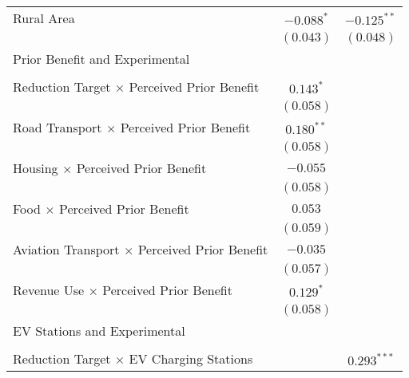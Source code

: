 \begin{center}
\begin{tiny}
\begin{longtable}{l@{} c@{} c@{}}
Rural Area                                                & $-0.088^{*}$     & $-0.125^{**}$    \\
                                                          & $(0.043)$        & $(0.048)$        \\
Prior Benefit and Experimental                            &                  &                  \\
                                                          &                  &                  \\
\quad Reduction Target $\times$ Perceived Prior Benefit   & $0.143^{*}$      &                  \\
                                                          & $(0.058)$        &                  \\
\quad Road Transport $\times$ Perceived Prior Benefit     & $0.180^{**}$     &                  \\
                                                          & $(0.058)$        &                  \\
\quad Housing $\times$ Perceived Prior Benefit            & $-0.055$         &                  \\
                                                          & $(0.058)$        &                  \\
\quad Food $\times$ Perceived Prior Benefit               & $0.053$          &                  \\
                                                          & $(0.059)$        &                  \\
\quad Aviation Transport $\times$ Perceived Prior Benefit & $-0.035$         &                  \\
                                                          & $(0.057)$        &                  \\
\quad Revenue Use $\times$ Perceived Prior Benefit        & $0.129^{*}$      &                  \\
                                                          & $(0.058)$        &                  \\
EV Stations and Experimental                              &                  &                  \\
                                                          &                  &                  \\
\quad Reduction Target $\times$ EV Charging Stations      &                  & $0.293^{***}$    \\

\end{longtable}
\end{tiny}
\end{center}
